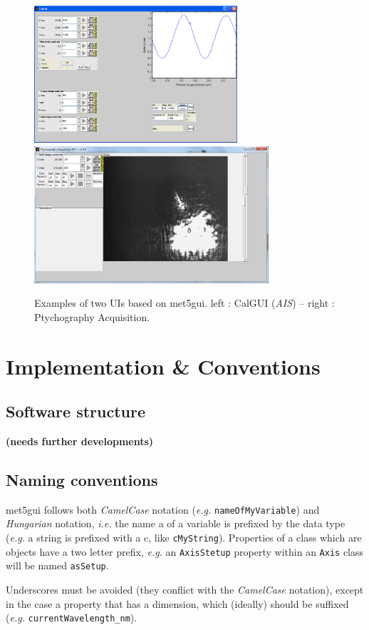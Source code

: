 \documentclass[10pt,letter,twoside]{report}
\newcommand{\temp}[1] {{\bf (#1)}}
\begin{document}
\begin{figure}[ht]
	\centerline{\includegraphics[height=2in]{img/exp-calGUI.png}
	\includegraphics[height=2in]{img/exp-ptycho.png}}
	\caption{Examples of two UIs based on met5gui. left : CalGUI (\textit{AIS}) -- right : Ptychography Acquisition.}
	\label{fig:exp}
\end{figure}

\chapter{Implementation \& Conventions}
\section{Software structure}
\temp{needs further developments}

\section{Naming conventions}
met5gui follows both \textit{CamelCase} notation (\textit{e.g.} \verb!nameOfMyVariable!) and \textit{Hungarian} notation, \textit{i.e.} the name a of a variable is prefixed by the data type (\textit{e.g.} a string is prefixed with a c, like \verb!cMyString!). Properties of a class which are objects have a two letter prefix, \textit{e.g.} an \verb!AxisStetup! property within an \verb!Axis! class will be named \verb!asSetup!. 

Underscores must be avoided (they conflict with the \textit{CamelCase} notation), except in the case a property that has a dimension, which (ideally) should be suffixed (\textit{e.g.} \verb!currentWavelength_nm!).
\end{document}

